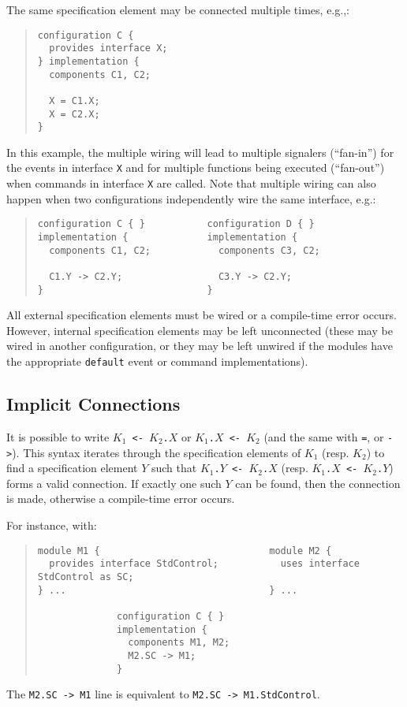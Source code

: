 \documentclass[11pt,letterpaper]{article}
\newcommand{\kw}[1]{{\tt #1}}
\newcommand{\code}[1]{{\tt #1}}
\begin{document}
The same specification element may be connected multiple times, e.g.,:
\begin{quote} \begin{verbatim}
configuration C {
  provides interface X;
} implementation {
  components C1, C2;

  X = C1.X;
  X = C2.X;
}
\end{verbatim} \end{quote}
In this example, the multiple wiring will lead to multiple signalers
(``fan-in'') for the events in interface \code{X} and for multiple
functions being executed (``fan-out'') when commands in interface \code{X}
are called. Note that multiple wiring can also happen when two
configurations independently wire the same interface, e.g.:
\begin{quote} \begin{verbatim}
configuration C { }           configuration D { }
implementation {              implementation {
  components C1, C2;            components C3, C2;

  C1.Y -> C2.Y;                 C3.Y -> C2.Y;
}                             }
\end{verbatim} \end{quote}

All external specification elements must be wired or a compile-time error
occurs. However, internal specification elements may be left unconnected
(these may be wired in another configuration, or they may be left unwired
if the modules have the appropriate \kw{default} event or command
implementations).

\subsection{Implicit Connections}
\label{sec:implicit}

It is possible to write \code{$K_1$ <- $K_2$.$X$} or \code{$K_1$.$X$ <-
$K_2$} (and the same with \kw{=}, or \kw{->}). This syntax iterates through
the specification elements of $K_1$ (resp. $K_2$) to find a specification
element $Y$ such that \code{$K_1$.$Y$ <- $K_2$.$X$} (resp. \code{$K_1$.$X$
<- $K_2$.$Y$}) forms a valid connection. If exactly one such $Y$ can
be found, then the connection is made, otherwise a compile-time error
occurs.

For instance, with:
\begin{quote} \begin{verbatim}
module M1 {                              module M2 {
  provides interface StdControl;           uses interface StdControl as SC;
} ...                                    } ...

              configuration C { }
              implementation {
                components M1, M2;
                M2.SC -> M1;
              }
\end{verbatim} \end{quote}
The \code{M2.SC -> M1} line is equivalent to \code{M2.SC -> M1.StdControl}.
\end{document}
